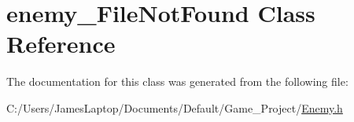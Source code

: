 \hypertarget{classenemy___file_not_found}{}\section{enemy\+\_\+\+File\+Not\+Found Class Reference}
\label{classenemy___file_not_found}


The documentation for this class was generated from the following file\+:\begin{DoxyCompactItemize}
\item 
C\+:/\+Users/\+James\+Laptop/\+Documents/\+Default/\+Game\+\_\+\+Project/\hyperlink{_enemy_8h}{Enemy.\+h}\end{DoxyCompactItemize}
